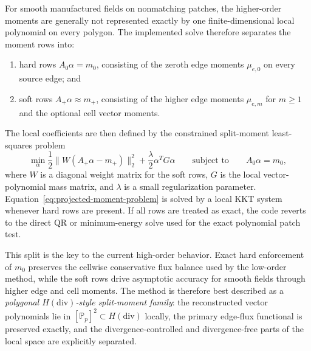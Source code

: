 \documentclass[11pt]{article}
\begin{document}
For smooth manufactured fields on nonmatching patches, the higher-order moments
are generally not represented exactly by one finite-dimensional local polynomial
on every polygon.  The implemented solve therefore separates the moment rows
into:
\begin{enumerate}
  \item hard rows \(A_0 \alpha = m_0\), consisting of the zeroth edge moments
        \(\mu_{e,0}\) on every source edge; and
  \item soft rows \(A_+ \alpha \approx m_+\), consisting of the higher edge
        moments \(\mu_{e,m}\) for \(m\ge 1\) and the optional cell vector
        moments.
\end{enumerate}
The local coefficients are then defined by the constrained split-moment
least-squares problem
\begin{equation}
  \min_{\alpha}
  \frac{1}{2}\|W(A_+\alpha - m_+)\|_2^2
  +
  \frac{\lambda}{2}\alpha^T G \alpha
  \qquad \text{subject to} \qquad
  A_0 \alpha = m_0 ,
  \label{eq:projected-moment-problem}
\end{equation}
where \(W\) is a diagonal weight matrix for the soft rows, \(G\) is the local
vector-polynomial mass matrix, and \(\lambda\) is a small regularization
parameter.  Equation~\eqref{eq:projected-moment-problem} is solved by a local
KKT system whenever hard rows are present.  If all rows are treated as exact,
the code reverts to the direct QR or minimum-energy solve used for the exact
polynomial patch test.

This split is the key to the current high-order behavior.  Exact hard
enforcement of \(m_0\) preserves the cellwise conservative flux balance used by
the low-order method, while the soft rows drive asymptotic accuracy for smooth
fields through higher edge and cell moments.  The method is therefore best
described as a \emph{polygonal \(H(\mathrm{div})\)-style split-moment
family}: the reconstructed vector polynomials lie in \([\mathbb{P}_p]^2\subset
H(\mathrm{div})\) locally, the primary edge-flux functional is preserved
exactly, and the divergence-controlled and divergence-free parts of the local
space are explicitly separated.
\end{document}
